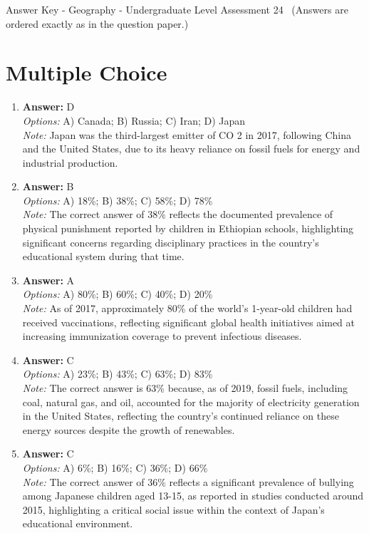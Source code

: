 \documentclass[12pt]{article}
\begin{document}
\begin{center}
Answer Key - Geography - Undergraduate Level Assessment 24 \
\small (Answers are ordered exactly as in the question paper.)
\end{center}

\section*{Multiple Choice}
\begin{enumerate}[label=\arabic*.]
\item \textbf{Answer:} D
\\ \textit{Options:} A) Canada; B) Russia; C) Iran; D) Japan
\\ \textit{Note:} Japan was the third-largest emitter of CO 2 in 2017, following China and the United States, due to its heavy reliance on fossil fuels for energy and industrial production.
\item \textbf{Answer:} B
\\ \textit{Options:} A) 18\%; B) 38\%; C) 58\%; D) 78\%
\\ \textit{Note:} The correct answer of 38\% reflects the documented prevalence of physical punishment reported by children in Ethiopian schools, highlighting significant concerns regarding disciplinary practices in the country's educational system during that time.
\item \textbf{Answer:} A
\\ \textit{Options:} A) 80\%; B) 60\%; C) 40\%; D) 20\%
\\ \textit{Note:} As of 2017, approximately 80\% of the world's 1-year-old children had received vaccinations, reflecting significant global health initiatives aimed at increasing immunization coverage to prevent infectious diseases.
\item \textbf{Answer:} C
\\ \textit{Options:} A) 23\%; B) 43\%; C) 63\%; D) 83\%
\\ \textit{Note:} The correct answer is 63\% because, as of 2019, fossil fuels, including coal, natural gas, and oil, accounted for the majority of electricity generation in the United States, reflecting the country's continued reliance on these energy sources despite the growth of renewables.
\item \textbf{Answer:} C
\\ \textit{Options:} A) 6\%; B) 16\%; C) 36\%; D) 66\%
\\ \textit{Note:} The correct answer of 36\% reflects a significant prevalence of bullying among Japanese children aged 13-15, as reported in studies conducted around 2015, highlighting a critical social issue within the context of Japan's educational environment.
\end{enumerate}
\end{document}
